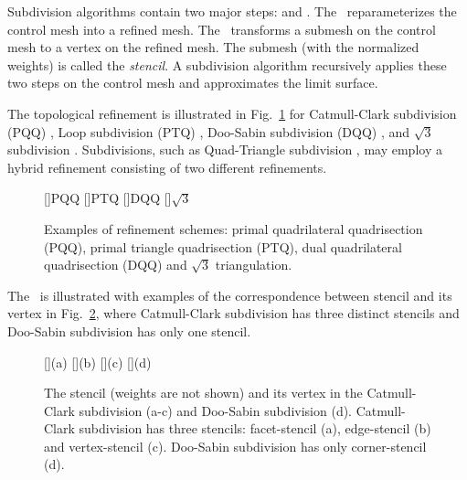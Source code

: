 

Subdivision algorithms \cite{Warren:subdivision, Sub:course:2000} 
contain two major steps: \emph{\tr} and \emph{\gm}.
The \tr\ reparameterizes the control mesh into a refined 
mesh. The \gm\ transforms a submesh on the control mesh
to a vertex on the refined mesh. The submesh (with
the normalized weights) is called the
\emph{stencil}. A subdivision algorithm recursively 
applies these two steps on the control mesh and approximates
the limit surface. 

The topological refinement is illustrated 
in Fig.~\ref{fig:RefSchemes} for Catmull-Clark
subdivision (PQQ) \cite{cc}, Loop subdivision (PTQ) \cite{loop},
Doo-Sabin subdivision (DQQ) \cite{ds}, and $\sqrt{3}$ subdivision
\cite{sqrt3}. Subdivisions, such as Quad-Triangle subdivision 
\cite{qts,l-pg-03}, may employ a hybrid refinement consisting
of two different refinements.
\begin{figure}[htb]
  \centering
  []{\scriptsize PQQ} 
  []{\scriptsize PTQ}
  []{\scriptsize DQQ} 
  []{\scriptsize $\sqrt{3}$} 
  \caption{Examples of refinement schemes: 
    primal quadrilateral quadrisection (PQQ),
    primal triangle quadrisection (PTQ),
    dual quadrilateral quadrisection (DQQ) and
    $\sqrt{3}$ triangulation.}
  \label{fig:RefSchemes}
\end{figure}
The \gm\ is illustrated with examples of the correspondence between
stencil and its vertex in Fig.~\ref{fig:RefMap}, where Catmull-Clark
subdivision has three distinct stencils and Doo-Sabin subdivision has
only one stencil. 
\begin{figure}
  \centering
  []{(a)}
  []{(b)}
  []{(c)}
  []{(d)}
  \caption{The stencil (weights are not shown) and its 
           vertex in the Catmull-Clark subdivision (a-c)
           and Doo-Sabin subdivision (d). Catmull-Clark
           subdivision has three stencils: facet-stencil (a), 
           edge-stencil (b) and vertex-stencil (c). 
           Doo-Sabin subdivision has only corner-stencil (d).}
  \label{fig:RefMap}
\end{figure}


